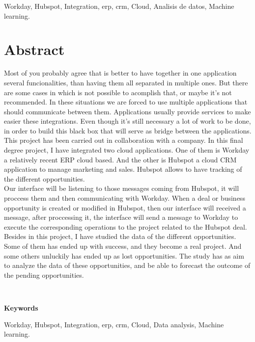     Workday, Hubspot, Integration, \acrshort{erp}, \acrshort{crm}, Cloud, Analisis de datos, Machine learning.


\chapter*{Abstract}
	Most of you probably agree that is better to have together in one application several funcionalities, than having them all separated in multiple ones.
	But there are some cases in which is not possible to acomplish that, or maybe it's not recommended. 
	In these situations we are forced to use multiple applications that should communicate between them.
	Applications usually provide services to make easier these integrations. Even though it's still necessary a lot of work to be done, in order to build this black box that will serve as bridge between the applications.\\
	
	This project has been carried out in collaboration with a company.
	In this final degree project, I have integrated two cloud applications. One of them is Workday a relatively recent ERP cloud based. 
	And the other is Hubspot a cloud CRM application to manage marketing and sales. Hubspot allows to have tracking of the different opportunities.\\
	
	Our interface will be listening to those messages coming from Hubspot, it will proccess them and then communicating with Workday.
	When a deal or business opportunity is created or modified in Hubspot, then our interface will received a message, after proccessing it,
	the interface will send a message to Workday to execute the corresponding operations to the project related to the Hubspot deal.\\
	
	Besides in this project, I have studied the data of the different opportunities.
	Some of them has ended up with success, and they become a real project. And some others unluckily has ended up as lost opportunities. 
	The study has as aim to analyze the data of these opportunities, and be able to forecast the outcome of the pending opportunities.
	
	\
	
	\textbf{Keywords}
    
    Workday, Hubspot, Integration, \acrshort{erp}, \acrshort{crm}, Cloud, Data analysis, Machine learning.
	
	
